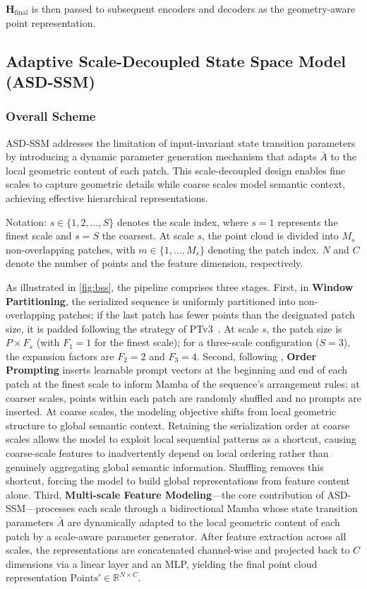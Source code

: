 \documentclass[a4paper,fleqn]{cas-sc}
\begin{document}
$\mathbf{H}_{\text{final}}$ is then passed to subsequent encoders and decoders as the geometry-aware point representation.


\subsection{Adaptive Scale-Decoupled State Space Model (ASD-SSM)}

\subsubsection{Overall Scheme}
ASD-SSM addresses the limitation of input-invariant state transition parameters  by introducing a dynamic parameter generation mechanism that adapts $\bar{A}$ to the local geometric content of each patch. This scale-decoupled design enables fine scales to capture geometric details while coarse scales model semantic context, achieving effective hierarchical representations.

Notation: $s \in \{1, 2, \ldots, S\}$ denotes the scale index, where $s=1$ represents the finest scale and $s=S$ the coarsest. At scale $s$, the point cloud is divided into $M_s$ non-overlapping patches, with $m \in \{1, \ldots, M_s\}$ denoting the patch index. $N$ and $C$ denote the number of points and the feature dimension, respectively.

As illustrated in \cref{fig:bss}, the pipeline comprises three stages. First, in \textbf{Window Partitioning}, the serialized sequence is uniformly partitioned into non-overlapping patches; if the last patch has fewer points than the designated patch size, it is padded following the strategy of PTv3~\cite{ptv3}. At scale $s$, the patch size is $P \times F_s$ (with $F_1 = 1$ for the finest scale); for a three-scale configuration ($S=3$), the expansion factors are $F_2=2$ and $F_3=4$. Second, following \cite{pcm}, \textbf{Order Prompting} inserts learnable prompt vectors at the beginning and end of each patch at the finest scale to inform Mamba of the sequence's arrangement rules; at coarser scales, points within each patch are randomly shuffled and no prompts are inserted. At coarse scales, the modeling objective shifts from local geometric structure to global semantic context. Retaining the serialization order at coarse scales allows the model to exploit local sequential patterns as a shortcut, causing coarse-scale features to inadvertently depend on local ordering rather than genuinely aggregating global semantic information. Shuffling removes this shortcut, forcing the model to build global representations from feature content alone. Third, \textbf{Multi-scale Feature Modeling}—the core contribution of ASD-SSM—processes each scale through a bidirectional Mamba whose state transition parameters $\bar{A}$ are dynamically adapted to the local geometric content of each patch by a scale-aware parameter generator. After feature extraction across all scales, the representations are concatenated channel-wise and projected back to $C$ dimensions via a linear layer and an MLP, yielding the final point cloud representation $\text{Points}' \in \mathbb{R}^{N \times C}$.
\end{document}
